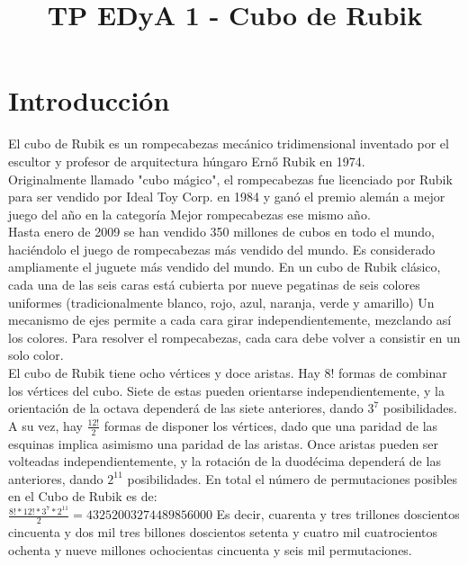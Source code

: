 \documentclass[11pt,a4paper]{article}
\begin{document}
\title{TP EDyA 1 - Cubo de Rubik}

\maketitle


\section{Introducción}

El cubo de Rubik es un rompecabezas mecánico tridimensional inventado por el escultor y profesor de arquitectura húngaro Ernő Rubik en 1974.\\ Originalmente llamado "cubo mágico", el rompecabezas fue licenciado por Rubik para ser vendido por Ideal Toy Corp. en 1984 y ganó el premio alemán a mejor juego del año en la categoría Mejor rompecabezas ese mismo año.\\ Hasta enero de 2009 se han vendido 350 millones de cubos en todo el mundo, haciéndolo el juego de rompecabezas más vendido del mundo. Es considerado ampliamente el juguete más vendido del mundo.
En un cubo de Rubik clásico, cada una de las seis caras está cubierta por nueve pegatinas de seis colores uniformes (tradicionalmente blanco, rojo, azul, naranja, verde y amarillo) Un mecanismo de ejes permite a cada cara girar independientemente, mezclando así los colores. Para resolver el rompecabezas, cada cara debe volver a consistir en un solo color.\\
El cubo de Rubik tiene ocho vértices y doce aristas. Hay $8!$ formas de combinar los vértices del cubo. Siete de estas pueden orientarse independientemente, y la orientación de la octava dependerá de las siete anteriores, dando  $3^7$ posibilidades. A su vez, hay $\frac{12!}{2}$ formas de disponer los vértices, dado que una paridad de las esquinas implica asimismo una paridad de las aristas. Once aristas pueden ser volteadas independientemente, y la rotación de la duodécima dependerá de las anteriores, dando $2^11$ posibilidades. En total el número de permutaciones posibles en el Cubo de Rubik es de:\\
 $\frac{8!*12!*3^7*2^11}{2} = 43 252 003 274 489 856 000$
Es decir, cuarenta y tres trillones doscientos cincuenta y dos mil tres billones doscientos setenta y cuatro mil cuatrocientos ochenta y nueve millones ochocientas cincuenta y seis mil permutaciones.\\
\end{document}
